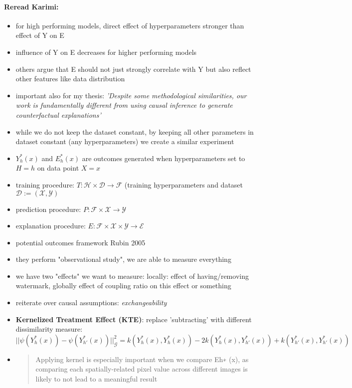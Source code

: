 \paragraph{Reread Karimi:}
\begin{itemize}
    \item for high performing models, direct effect of hyperparameters stronger than effect of Y on E
    \item influence of Y on E decreases for higher performing models
    \item others argue that E should not just strongly correlate with Y but also reflect other features like data distribution
    \item important also for my thesis: \textit{'Despite some methodological similarities, our work is fundamentally different from using causal inference to generate counterfactual explanations'}
    \item while we do not keep the dataset constant, by keeping all other parameters in dataset constant (any hyperparameters) we create a similar experiment
    \item $Y_h^*(x)$ and $E_h^*(x)$ are outcomes generated when hyperparameters set to $H= h$ on data point $X=x$
    \item training procedure: $T: \mathcal{H} \times \mathcal{D} \rightarrow \mathcal{F}$ (training hyperparameters and dataset $\mathcal{D}:= (\mathcal{X,Y})$
    \item prediction procedure: $P: \mathcal{F} \times \mathcal{X} \rightarrow \mathcal{Y}$
    \item explanation procedure: $E: \mathcal{F} \times \mathcal{X} \times \mathcal{Y} \rightarrow \mathcal{E}$ 
    \item potential outcomes framework Rubin 2005 \cite{Rubin2005}
    \item they perform "observational study", we are able to measure everything
    \item we have two "effects" we want to measure: locally: effect of having/removing watermark, globally effect of coupling ratio on this effect or something
    \item reiterate over causal assumptions: \textit{exchangeability}
    \item \textbf{Kernelized Treatment Effect (KTE)}: replace 'subtracting' with different dissimilarity measure: $
    ||\psi(Y_h^*(x)) - \psi(Y_{h'}^*(x))||_{\mathcal{G}}^2 =   k(Y_h^*(x), Y_h^*(x)) - 2k(Y_h^*(x),Y_{h'}^*(x)) + k(Y_{h'}^*(x),Y_{h'}^*(x))  
    $
    \item \begin{quote}Applying kernel is especially important when we compare Eh∗ (x), as comparing each spatially-related pixel value across different images is likely to not lead to a meaningful result

\end{quote}
\end{itemize}
